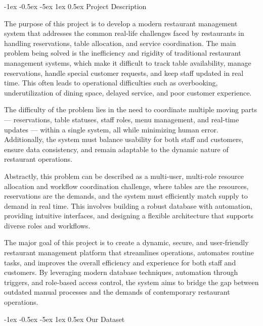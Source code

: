 \documentclass[12pt]{article}
\makeatletter
\renewcommand\section{\@startsection{section}{1}{\z@}%
    {-1ex \@plus -0.5ex \@minus -5ex} %
    {1ex \@plus 0.5ex} %
    {\normalfont\Large\bfseries}} %
\makeatother
\begin{document}
\section{Project Description}

The purpose of this project is to develop a modern restaurant management system that addresses the common real-life challenges faced by restaurants in handling reservations, table allocation, and service coordination. The main problem being solved is the inefficiency and rigidity of traditional restaurant management systems, which make it difficult to track table availability, manage reservations, handle special customer requests, and keep staff updated in real time. This often leads to operational difficulties such as overbooking, underutilization of dining space, delayed service, and poor customer experience.

The difficulty of the problem lies in the need to coordinate multiple moving parts — reservations, table statuses, staff roles, menu management, and real-time updates — within a single system, all while minimizing human error. Additionally, the system must balance usability for both staff and customers, ensure data consistency, and remain adaptable to the dynamic nature of restaurant operations.

Abstractly, this problem can be described as a multi-user, multi-role resource allocation and workflow coordination challenge, where tables are the resources, reservations are the demands, and the system must efficiently match supply to demand in real time. This involves building a robust database with automation, providing intuitive interfaces, and designing a flexible architecture that supports diverse roles and workflows.

The major goal of this project is to create a dynamic, secure, and user-friendly restaurant management platform that streamlines operations, automates routine tasks, and improves the overall efficiency and experience for both staff and customers. By leveraging modern database techniques, automation through triggers, and role-based access control, the system aims to bridge the gap between outdated manual processes and the demands of contemporary restaurant operations.

\section{Our Dataset}
\end{document}

